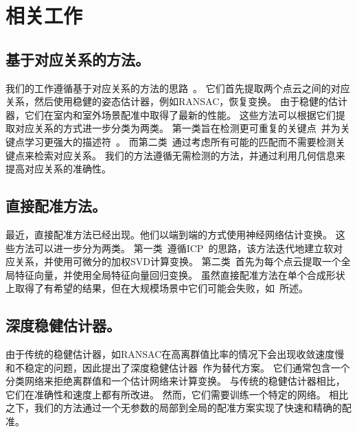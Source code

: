%
%
%
%
%
%


\chapter{相关工作}
\label{sec:related}

\section{基于对应关系的方法。}
我们的工作遵循基于对应关系的方法的思路~\cite{deng2018ppfnet,deng2018ppf,gojcic2019perfect,choy2019fully}。
它们首先提取两个点云之间的对应关系，然后使用稳健的姿态估计器，例如RANSAC，恢复变换。
由于稳健的估计器，它们在室内和室外场景配准中取得了最新的性能。
这些方法可以根据它们提取对应关系的方式进一步分类为两类。
第一类旨在检测更可重复的关键点~\cite{bai2020d3feat,huang2021predator}并为关键点学习更强大的描述符~\cite{choy2019fully,ao2021spinnet,wang2021you}。
而第二类~\cite{yu2021cofinet}通过考虑所有可能的匹配而不需要检测关键点来检索对应关系。
我们的方法遵循无需检测的方法，并通过利用几何信息来提高对应关系的准确性。

\section{直接配准方法。}
最近，直接配准方法已经出现。他们以端到端的方式使用神经网络估计变换。
这些方法可以进一步分为两类。
第一类~\cite{wang2019deep,wang2019prnet,yew2020rpm,fu2021robust}遵循ICP~\cite{besl1992method}的思路，该方法迭代地建立软对应关系，并使用可微分的加权SVD计算变换。
第二类~\cite{aoki2019pointnetlk,huang2020feature,xu2021omnet}首先为每个点云提取一个全局特征向量，并使用全局特征向量回归变换。
虽然直接配准方法在单个合成形状上取得了有希望的结果，但在大规模场景中它们可能会失败，如~\cite{huang2021predator}所述。

\section{深度稳健估计器。}
由于传统的稳健估计器，如RANSAC在高离群值比率的情况下会出现收敛速度慢和不稳定的问题，因此提出了深度稳健估计器~\cite{pais20203dregnet,choy2020deep,bai2021pointdsc}作为替代方案。
它们通常包含一个分类网络来拒绝离群值和一个估计网络来计算变换。
与传统的稳健估计器相比，它们在准确性和速度上都有所改进。
然而，它们需要训练一个特定的网络。
相比之下，我们的方法通过一个无参数的局部到全局的配准方案实现了快速和精确的配准。